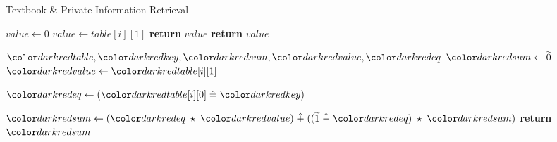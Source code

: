 \begin{algorithm}[H]
\caption{Textbook \& Private Information Retrieval}\label{a:pir}
\begin{algorithmic}[1]
\renewcommand{\algorithmicrequire}{\textbf{Private Vars:}}

    \State $value \gets 0$
            \State $value \gets table[i][1]$
            \State \textbf{return} {$value$} 
        \EndIf
    \EndFor
    \State \textbf{return} {$value$} 
\EndProcedure

\begin{spacing}{0.5}
\end{spacing}

\Require $\red{table}, \red{key}, \red{sum}, \red{value}, \red{eq}$
    \State $\red{sum} \gets \enc{0}$
        \State $\red{value} \gets \red{table}[i][1]$

        \State $\red{eq} \gets (\red{table}[i][0] \heq \red{key})$

        \State $\red{sum} \gets (\red{eq} \hmul \red{value}) \hplus ((\enc{1} \hminus \red{eq}) \hmul \red{sum})$
    \EndFor
    \State \textbf{return} {$\red{sum}$}
\EndProcedure

\end{algorithmic}
\end{algorithm}
